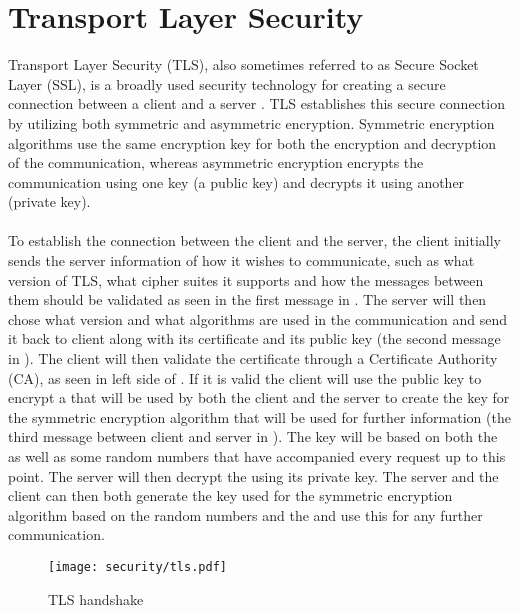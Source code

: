
\section{Transport Layer Security}
\label{sec:transport_layer_security}

Transport Layer Security (TLS), also sometimes referred to as Secure Socket Layer (SSL), is a broadly used security technology for creating a secure connection between a client and a server \parencite{transport_layer_security}. TLS establishes this secure connection by utilizing both symmetric and asymmetric encryption. Symmetric encryption algorithms use the same encryption key for both the encryption and decryption of the communication, whereas asymmetric encryption encrypts the communication using one key (a public key) and decrypts it using another (private key). 
\\\\
To establish the connection between the client and the server, the client initially sends the server information of how it wishes to communicate, such as what version of TLS, what cipher suites it supports and how the messages between them should be validated as seen in the first message in . The server will then chose what version and what algorithms are used in the communication and send it back to client along with its certificate and its public key (the second message in ). The client will then validate the certificate through a Certificate Authority (CA), as seen in left side of . If it is valid the client will use the public key to encrypt a  that will be used by both the client and the server to create the key for the symmetric encryption algorithm that will be used for further information (the third message between client and server in ). The key will be based on both the  as well as some random numbers that have accompanied every request up to this point. The server will then decrypt the  using its private key. The server and the client can then both generate the key used for the symmetric encryption algorithm based on the random numbers and the  and use this for any further communication.

\begin{figure}[!htbp]
    \centering
    \texttt{[image: security/tls.pdf]}
    \caption{TLS handshake}
    \label{fig:tls}
\end{figure}
\FloatBarrier

